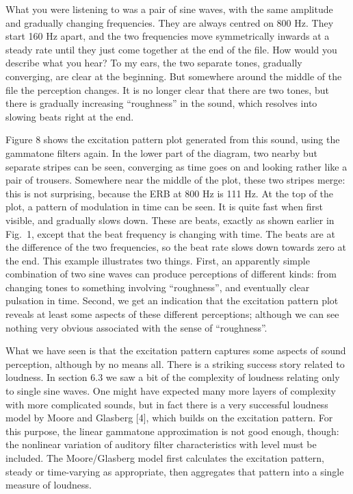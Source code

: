   What you were listening to was a pair of sine waves, with the same amplitude 
  and gradually changing frequencies. They are always centred on 800 Hz. They 
  start 160 Hz apart, and the two frequencies move symmetrically inwards at a 
  steady rate until they just come together at the end of the file. How would 
  you describe what you hear? To my ears, the two separate tones, gradually 
  converging, are clear at the beginning. But somewhere around the middle of 
  the file the perception changes. It is no longer clear that there are two 
  tones, but there is gradually increasing ``roughness'' in the sound, which 
  resolves into slowing beats right at the end. 

  Figure 8 shows the excitation pattern plot generated from this sound, using 
  the gammatone filters again. In the lower part of the diagram, two nearby but 
  separate stripes can be seen, converging as time goes on and looking rather 
  like a pair of trousers. Somewhere near the middle of the plot, these two 
  stripes merge: this is not surprising, because the ERB at 800 Hz is 111 Hz. 
  At the top of the plot, a pattern of modulation in time can be seen. It is 
  quite fast when first visible, and gradually slows down. These are beats, 
  exactly as shown earlier in Fig.\ 1, except that the beat frequency is 
  changing with time. The beats are at the difference of the two frequencies, 
  so the beat rate slows down towards zero at the end. This example illustrates 
  two things. First, an apparently simple combination of two sine waves can 
  produce perceptions of different kinds: from changing tones to something 
  involving ``roughness'', and eventually clear pulsation in time. Second, we 
  get an indication that the excitation pattern plot reveals at least some 
  aspects of these different perceptions; although we can see nothing very 
  obvious associated with the sense of ``roughness''. 


  What we have seen is that the excitation pattern captures some aspects of 
  sound perception, although by no means all. There is a striking success story 
  related to loudness. In section 6.3 we saw a bit of the complexity of 
  loudness relating only to single sine waves. One might have expected many 
  more layers of complexity with more complicated sounds, but in fact there is 
  a very successful loudness model by Moore and Glasberg [4], which builds on 
  the excitation pattern. For this purpose, the linear gammatone approximation 
  is not good enough, though: the nonlinear variation of auditory filter 
  characteristics with level must be included. The Moore/Glasberg model first 
  calculates the excitation pattern, steady or time-varying as appropriate, 
  then aggregates that pattern into a single measure of loudness. 

